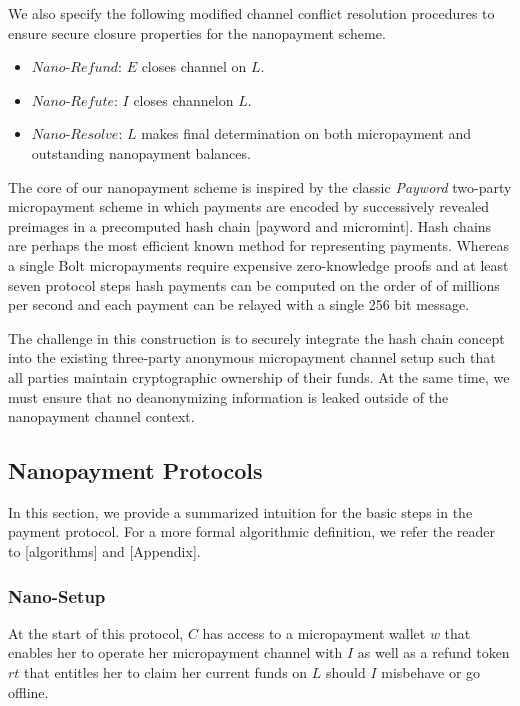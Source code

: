 We also specify the following modified channel conflict resolution procedures to
ensure secure closure properties for the nanopayment scheme.

\begin{itemize}
\item $Nano$-$Refund$: $E$ closes channel on $L$.
\item $Nano$-$Refute$: $I$ closes channelon $L$.
\item $Nano$-$Resolve$: $L$ makes final determination on both micropayment and
  outstanding nanopayment balances.
\end{itemize}

The core of our nanopayment scheme is inspired by the classic \emph{Payword}
two-party micropayment scheme in which payments are encoded by successively
revealed preimages in a precomputed hash chain [payword and micromint]. Hash
chains are perhaps the most efficient known method for representing
payments. Whereas a single Bolt micropayments require expensive zero-knowledge
proofs and at least seven protocol steps hash payments can be computed on the
order of of millions per second and each payment can be relayed with a single
256 bit message.

The challenge in this construction is to securely integrate the hash chain
concept into the existing three-party anonymous micropayment channel setup such
that all parties maintain cryptographic ownership of their funds. At the same
time, we must ensure that no deanonymizing information is leaked outside of the
nanopayment channel context.

\subsection{Nanopayment Protocols}

In this section, we provide a summarized intuition for the basic steps in the
payment protocol. For a more formal algorithmic definition, we refer the reader
to [algorithms] and [Appendix].

\subsubsection{Nano-Setup}

At the start of this protocol, $C$ has access to a micropayment wallet $w$ that
enables her to operate her micropayment channel with $I$ as well as a refund
token $rt$ that entitles her to claim her current funds on $L$ should $I$ misbehave
or go offline.

